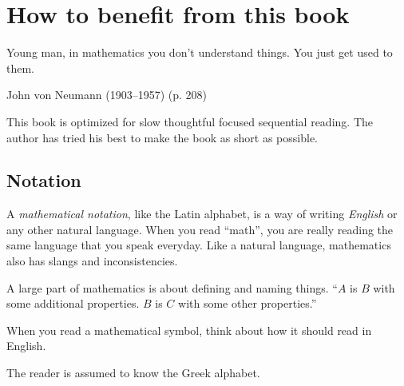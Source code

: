 \chapter{How to benefit from this book}

\epigraph{Young man, in mathematics you don't understand things. You just get used to them.}{John von Neumann (1903--1957) \cite{zukav1979dancing} (p. 208)}

This book is optimized for slow thoughtful focused sequential reading.
The author has tried his best to make the book as short as possible.

\section{Notation}

A \emph{mathematical notation}, like the Latin alphabet,
is a way of writing \emph{English} or any other natural language.
When you read ``math'',
you are really reading the same language
that you speak everyday.
Like a natural language,
mathematics also has slangs and inconsistencies.

A large part of mathematics is about defining and naming things.
``\(A\) is \(B\) with some additional properties. \(B\) is \(C\) with some other properties.''

When you read a mathematical symbol, think about how it should read in English.

The reader is assumed to know the Greek alphabet.
